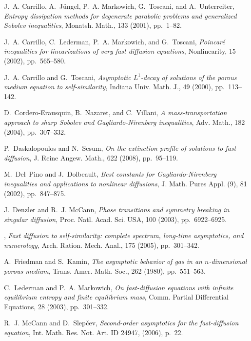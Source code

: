 \begin{thebibliography}{10}
{\sc J.~A. Carrillo, A.~J{\"u}ngel, P.~A. Markowich, G.~Toscani, and
  A.~Unterreiter}, {\em Entropy dissipation methods for degenerate parabolic
  problems and generalized {S}obolev inequalities}, Monatsh. Math., 133 (2001),
  pp.~1--82.

{\sc J.~A. Carrillo, C.~Lederman, P.~A. Markowich, and G.~Toscani}, {\em
  Poincar\'e inequalities for linearizations of very fast diffusion equations},
  Nonlinearity, 15 (2002), pp.~565--580.

{\sc J.~A. Carrillo and G.~Toscani}, {\em Asymptotic {$L^1$}-decay of solutions
  of the porous medium equation to self-similarity}, Indiana Univ. Math. J., 49
  (2000), pp.~113--142.

{\sc D.~Cordero-Erausquin, B.~Nazaret, and C.~Villani}, {\em A
  mass-transportation approach to sharp {S}obolev and {G}agliardo-{N}irenberg
  inequalities}, Adv. Math., 182 (2004), pp.~307--332.

{\sc P.~Daskalopoulos and N.~Sesum}, {\em On the extinction profile of
  solutions to fast diffusion}, J. Reine Angew. Math., 622 (2008), pp.~95--119.

{\sc M.~Del~Pino and J.~Dolbeault}, {\em Best constants for
  {G}agliardo-{N}irenberg inequalities and applications to nonlinear
  diffusions}, J. Math. Pures Appl. (9), 81 (2002), pp.~847--875.

{\sc J.~Denzler and R.~J. McCann}, {\em Phase transitions and symmetry breaking
  in singular diffusion}, Proc. Natl. Acad. Sci. USA, 100 (2003),
  pp.~6922--6925.

\leavevmode\vrule height 2pt depth -1.6pt width 23pt, {\em Fast diffusion to
  self-similarity: complete spectrum, long-time asymptotics, and numerology},
  Arch. Ration. Mech. Anal., 175 (2005), pp.~301--342.

{\sc A.~Friedman and S.~Kamin}, {\em The asymptotic behavior of gas in an
  {$n$}-dimensional porous medium}, Trans. Amer. Math. Soc., 262 (1980),
  pp.~551--563.

{\sc C.~Lederman and P.~A. Markowich}, {\em On fast-diffusion equations with
  infinite equilibrium entropy and finite equilibrium mass}, Comm. Partial
  Differential Equations, 28 (2003), pp.~301--332.

{\sc R.~J. McCann and D.~Slep{\v{c}}ev}, {\em Second-order asymptotics for the
  fast-diffusion equation}, Int. Math. Res. Not. Art. ID 24947,  (2006), p.~22.


\end{thebibliography}
